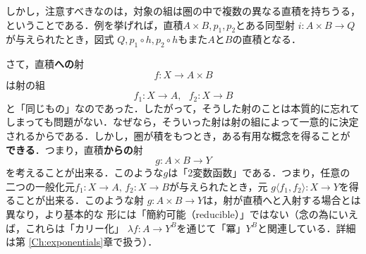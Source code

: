 しかし，注意すべきなのは，対象の組は圏の中で複数の異なる直積を持ちうる，
ということである．例を挙げれば，直積$A \times B, p_1, p_2$とある同型射
$i: A \times B \to Q$が与えられたとき，図式
$Q, p_1 \circ h, p_2 \circ h$もまた$A$と$B$の直積となる．

さて，直積{\bfseries への}射
\[
 f: X \to A \times B
\]
は射の組
\[
 f_1: X \to A,\ \ \ f_2: X \to B
\]
と「同じもの」なのであった．したがって，そうした射のことは本質的に忘れて
しまっても問題がない．なぜなら，そういった射は射の組によって一意的に決定
されるからである．しかし，圏が積をもつとき，ある有用な概念を得ることが
{\bfseries できる}．つまり，直積{\bfseries からの}射
\[
 g: A \times B \to Y
\]
を考えることが出来る．このような$g$は「2変数函数」である．つまり，任意の
二つの一般化元$f_1: X \to A,\, f_2:X \to B$が与えられたとき，元
$g\langle f_1, f_2 \rangle: X  \to Y$を得ることが出来る．このような射
$g: A\times B \to Y$は，射が直積へと入射する場合とは異なり，より基本的な
形には「簡約可能（reducible）」ではない（念の為にいえば，これらは「カリー化」
$\lambda f : A \to Y^B$を通じて「冪」$Y^B$と関連している．詳細は第
\ref{Ch:exponentials}章で扱う）．
